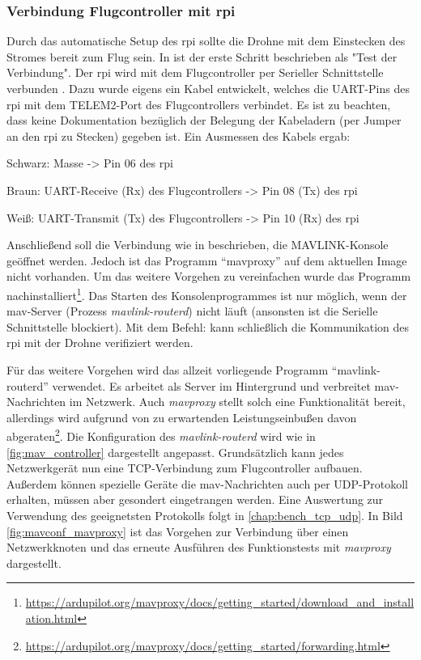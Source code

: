 \subsubsection{Verbindung Flugcontroller mit \gls{rpi}}
Durch das automatische Setup des \gls{rpi} sollte die Drohne mit dem Einstecken des Stromes bereit zum Flug sein. In \cite[Kapitel 4.3.6]{wirthErweiterungBestehendenDrohne2022} ist der erste Schritt beschrieben als "Test der Verbindung". Der \gls{rpi} wird mit dem Flugcontroller per Serieller Schnittstelle verbunden%
. Dazu wurde eigens ein Kabel entwickelt, welches die UART-Pins des \gls{rpi} mit dem TELEM2-Port des Flugcontrollers verbindet. Es ist zu beachten, dass keine Dokumentation bezüglich der Belegung der Kabeladern (per Jumper an den \gls{rpi} zu Stecken) gegeben ist. Ein Ausmessen des Kabels ergab:
\begin{compactitem}
    \item Schwarz: Masse -> Pin 06 des \gls{rpi}
    \item Braun: UART-Receive (Rx) des Flugcontrollers -> Pin 08 (Tx) des \gls{rpi}
    \item Weiß: UART-Transmit (Tx) des Flugcontrollers -> Pin 10 (Rx) des \gls{rpi}
\end{compactitem}
Anschließend soll die Verbindung wie in \cite[Kapitel 4.3.6]{wirthErweiterungBestehendenDrohne2022} beschrieben, die MAVLINK-Konsole geöffnet werden. Jedoch ist das Programm \enquote{mavproxy} auf dem aktuellen Image nicht vorhanden. Um das weitere Vorgehen zu vereinfachen wurde das Programm nachinstalliert\footnote{\url{https://ardupilot.org/mavproxy/docs/getting_started/download_and_installation.html}\cite{ardupilotdevteamGettingStartedMAVProxy}}. Das Starten des Konsolenprogrammes ist nur möglich, wenn der \gls{mav}-Server (Prozess \textit{mavlink-routerd}) nicht läuft (ansonsten ist die Serielle Schnittstelle blockiert). Mit dem Befehl:  kann schließlich die Kommunikation des \gls{rpi} mit der Drohne verifiziert werden.

Für das weitere Vorgehen wird das allzeit vorliegende Programm \enquote{mavlink-routerd} verwendet. Es arbeitet als Server im Hintergrund und verbreitet \gls{mav}-Nachrichten im Netzwerk. Auch \textit{mavproxy} stellt solch eine Funktionalität bereit, allerdings wird aufgrund von zu erwartenden Leistungseinbußen davon abgeraten\footnote{\url{https://ardupilot.org/mavproxy/docs/getting_started/forwarding.html}\cite{ardupilotdevteamGettingStartedMAVProxy}}. Die Konfiguration des \textit{mavlink-routerd} wird wie in \ref{fig:mav_controller} dargestellt angepasst. Grundsätzlich kann jedes Netzwerkgerät nun eine TCP-Verbindung zum Flugcontroller aufbauen. Außerdem können spezielle Geräte die \gls{mav}-Nachrichten auch per UDP-Protokoll erhalten, müssen aber gesondert eingetrangen werden. Eine Auswertung zur Verwendung des geeignetsten Protokolls folgt in \cref{chap:bench_tcp_udp}. In Bild \ref{fig:mavconf_mavproxy} ist das Vorgehen zur Verbindung über einen Netzwerkknoten und das erneute Ausführen des Funktionstests mit \textit{mavproxy} dargestellt.


